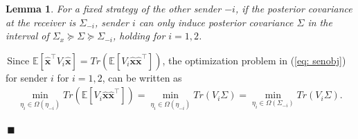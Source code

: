 \documentclass[12pt,journal,onecolumn]{IEEEtran}
\newtheorem{lemma}{Lemma}
\newenvironment{Proof}[1]{\medskip\par\noindent{\bf Proof:\,}\,#1}{{\mbox{\,$\blacksquare$}\par}}
\begin{document}
\begin{lemma} \label{Lemma_1}
For a fixed strategy of the other sender $-i$, if the posterior covariance at the receiver is $\Sigma_{-i}$, sender $i$ can only induce posterior covariance $\Sigma$ in the interval of $\Sigma_x\succeq\Sigma\succeq\Sigma_{-i}$, holding for $i=1,2$.
\end{lemma}
\begin{Proof}
Since $\mathbb{E}[\hat{\boldsymbol{x}}^\top V_i\hat{\boldsymbol{x}}] = Tr(\mathbb{E}[V_i\hat{\boldsymbol{x}}\hat{\boldsymbol{x}}^\top])$, the optimization problem in (\ref{eq: senobj}) for sender $i$ for $i =1,2$, can be written as
\begin{align*}
    \min_{\eta_i\in\Omega(\eta_{-i})} Tr(\mathbb{E}[V_i\hat{\boldsymbol{x}}\hat{\boldsymbol{x}}^\top])=\min_{\eta_i\in\Omega(\eta_{-i})} Tr (V_i \Sigma)=\min_{\eta_i\in\Omega(\Sigma_{-i})} Tr(V_i \Sigma).
\end{align*}


\end{Proof}
\end{document}
